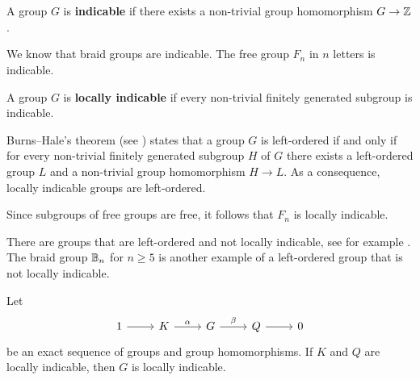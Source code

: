 \chapter{}


\begin{definition}
    A group $G$ is \textbf{indicable} if
    there exists a non-trivial group homomorphism $G\to\mathbb{Z}$.
\end{definition}

We know that braid groups are indicable.
The free group $F_n$ in $n$ letters is indicable. 

\begin{definition}
    A group $G$ is \textbf{locally indicable} if every 
    non-trivial finitely generated subgroup is indicable.
\end{definition}

Burns--Hale's theorem (see \cite[Theorem 1.50]{MR3560661}) states that a group $G$ is left-ordered if and only if
for every non-trivial finitely generated subgroup $H$ of $G$ there exists 
a left-ordered group $L$ and a non-trivial group homomorphism $H\to L$. As a consequence, 
locally indicable groups are left-ordered. 

\begin{example}
    Since subgroups of free groups are free, 
    it follows that $F_n$ is locally indicable. 
\end{example}

There are groups that are left-ordered and not locally indicable, see
for example \cite{MR1084707}. The braid group
$\mathbb{B}_n$ for $n\geq5$ is another example of a left-ordered group that is not locally indicable.

\begin{proposition}
\label{pro:LI_exact}
    Let
    \[\begin{tikzcd}
	1 & K & G & Q & 0
	\arrow[from=1-1, to=1-2]
	\arrow["\alpha", from=1-2, to=1-3]
	\arrow["\beta", from=1-3, to=1-4]
	\arrow[from=1-4, to=1-5]
\end{tikzcd}
\]
    be an exact sequence of groups and group homomorphisms. 
    If $K$ and $Q$ are
    locally indicable, then $G$ is locally indicable.
\end{proposition}

